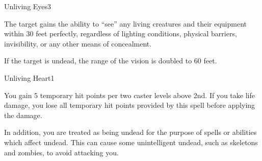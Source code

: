 \begin{spellsection}{Unliving Eyes}{3}
\begin{spellheader}
    \begin{spelltargetinginfo}
    \end{spelltargetinginfo}
\end{spellheader}
\begin{spellcontent}
    \begin{spelleffects}
        \spelleffect The target gains the ability to ``see'' any living creatures and their equipment within 30 feet perfectly, regardless of lighting conditions, physical barriers, invisibility, or any other means of concealment.

        If the target is undead, the range of the vision is doubled to 60 feet.
        \spelldur \durlong \dismissable
    \end{spelleffects}
\end{spellcontent}
\begin{spellfooter}
\end{spellfooter}
\end{spellsection}

\begin{spellsection}{Unliving Heart}{1}
\begin{spellheader}
    \begin{spelltargetinginfo}
    \end{spelltargetinginfo}
\end{spellheader}
\begin{spellcontent}
    \begin{spelleffects}
        \spelleffect You gain 5 temporary hit points  per two caster levels above 2nd. If you take life damage, you lose all temporary hit points provided by this spell before applying the damage.

        In addition, you are treated as being undead for the purpose of spells or abilities which affect undead. This can cause some unintelligent undead, such as skeletons and zombies, to avoid attacking you.
        \spelldur \durlong
    \end{spelleffects}
\end{spellcontent}
\begin{spellfooter}
\end{spellfooter}
\end{spellsection}

